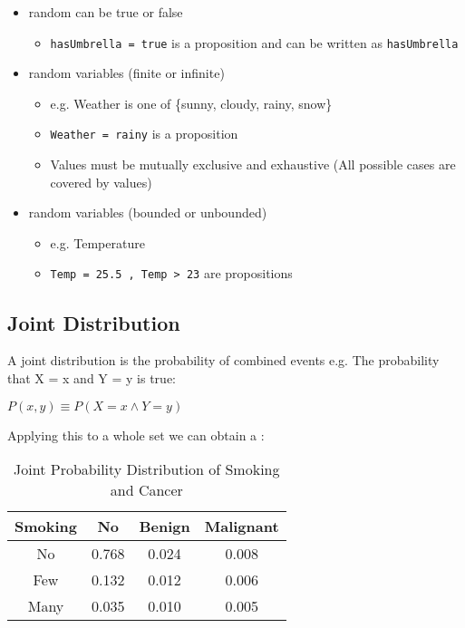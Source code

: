 \documentclass[
../../EiKI_Summary.tex,
]
{subfiles}
\begin{document}
\begin{defbox}
    \begin{itemize}
        \item {} random can be true or false
        \begin{itemize}
            \item \texttt{hasUmbrella = true} is a proposition and can be written as \texttt{hasUmbrella}
        \end{itemize}
        \item {} random variables (finite or infinite)
        \begin{itemize}
            \item e.g. Weather is one of \{sunny, cloudy, rainy, snow\}
            \item \texttt{Weather = rainy} is a proposition
            \item Values must be mutually exclusive and exhaustive (All possible cases are covered by values)
        \end{itemize}
        \item {} random variables (bounded or unbounded)
        \begin{itemize}
            \item e.g. Temperature
            \item \texttt{Temp = 25.5 , Temp > 23} are propositions
        \end{itemize}
    \end{itemize}
\end{defbox}

\subsection{Joint Distribution}
A joint distribution is the probability of combined events e.g. The probability that X = x and Y = y is true:

\begin{csmb*}
    $P(x,y) \equiv P(X = x \land Y = y)$
\end{csmb*}

Applying this to a whole set we can obtain a :
\begin{table}[H]
    \centering
    \renewcommand{\arraystretch}{1.3}
    \begin{tabular}{|c|ccc|}
        \hline
        \textbf{Smoking} & \textbf{No} & \textbf{Benign} & \textbf{Malignant} \\
        \hline
        No   & 0.768  & 0.024  & 0.008  \\
        Few  & 0.132  & 0.012  & 0.006  \\
        Many & 0.035  & 0.010  & 0.005  \\
        \hline
    \end{tabular}
    \caption{Joint Probability Distribution of Smoking and Cancer}
\end{table}
\end{document}
